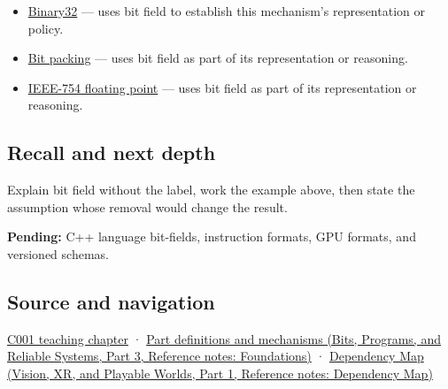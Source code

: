 \hypertarget{appendix-ac697f5c66e8-used-by}{}

\begin{itemize}
\item
  \hyperref[appendix-5057f9ad327f]{Binary32} --- uses bit field to establish this mechanism's representation or policy.
\item
  \hyperref[appendix-1f9963e1a5d1]{Bit packing} --- uses bit field as part of its representation or reasoning.
\item
  \hyperref[appendix-343615f49ddf]{IEEE-754 floating point} --- uses bit field as part of its representation or reasoning.
\end{itemize}

\subsection{Recall and next depth}\label{appendix-ac697f5c66e8-recall-and-next-depth}

\hypertarget{appendix-ac697f5c66e8-recall-and-next-depth}{}

Explain bit field without the label, work the example above, then state the assumption whose removal would change the result.

\textbf{Pending:} C++ language bit-fields, instruction formats, GPU formats, and versioned schemas.

\subsection{Source and navigation}\label{appendix-ac697f5c66e8-source-and-navigation}

\hypertarget{appendix-ac697f5c66e8-source-and-navigation}{}

\hyperref[01-foundations-i-ch001-from-a-signal-to-an-interpretation]{C001 teaching chapter} · \href{../01-Bits-Programs-and-Reliable-Systems-P03/main.pdf\#nameddest=appendix-fd090d982a15}{Part definitions and mechanisms (Bits, Programs, and Reliable Systems, Part 3, Reference notes: Foundations)} · \href{../07-Vision-XR-and-Playable-Worlds-P01/main.pdf\#nameddest=appendix-4ad47bdd269a}{Dependency Map (Vision, XR, and Playable Worlds, Part 1, Reference notes: Dependency Map)}
